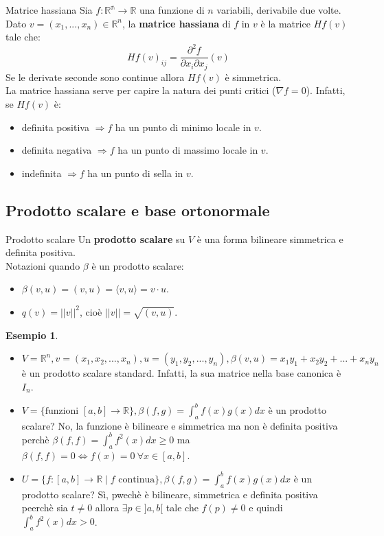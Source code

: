 \documentclass[a4paper]{article}
\theoremstyle{definition}
\newtheorem*{es}{Esempio}
\begin{document}
	\begin{deff}{Matrice hassiana}{}
		Sia $f: \mathbb{R^n} \to \mathbb{R}$ una funzione di $n$ variabili, derivabile due volte. \\
		Dato $v = (x_1, ..., x_n) \in \mathbb{R}^n$, la \textbf{matrice hassiana} di $f$ in $v$ è la matrice $Hf(v)$ tale che:
		\[ {Hf(v)}_{ij} = \frac{\partial^2 f}{\partial x_i \partial x_j}(v) \]
		Se le derivate seconde sono continue allora $Hf(v)$ è simmetrica. \\
		La matrice hassiana serve per capire la natura dei punti critici ($\nabla f = 0$). Infatti, se $Hf(v)$ è:
		\begin{itemize}
			\item definita positiva $\Rightarrow f$ ha un punto di minimo locale in $v$.
			\item definita negativa $\Rightarrow f$ ha un punto di massimo locale in $v$.
			\item indefinita $\Rightarrow f$ ha un punto di sella in $v$.
		\end{itemize}
	\end{deff}

	\subsection{Prodotto scalare e base ortonormale}

	\begin{deff}{Prodotto scalare}{}
		Un \textbf{prodotto scalare} su $V$ è una forma bilineare simmetrica e definita positiva. \\
		Notazioni quando $\beta$ è un prodotto scalare:
		\begin{itemize}
			\item $\beta(v, u) = (v, u) = \langle v, u \rangle = v \cdot u$.
			\item $q(v) = ||v||^2$, cioè $||v|| = \sqrt{(v, u)}$.
		\end{itemize}
	\end{deff}

	\begin{es}
		\begin{itemize}
			\item $V = \mathbb{R}^n, v = (x_1, x_2, ..., x_n), u = (y_1, y_2, ..., y_n), \beta(v, u) = x_1y_1 + x_2y_2 + ... + x_ny_n$ è un prodotto scalare standard.
			Infatti, la sua matrice nella base canonica è $I_n$.
			\item $V = \{\text{funzioni } [a, b] \to \mathbb{R}\}, \beta(f, g) = \int_a^b f(x)g(x)dx$ è un prodotto scalare?
			No, la funzione è bilineare e simmetrica ma non è definita positiva perchè $\beta(f, f) = \int_a^b f^2(x)dx \ge 0$ ma $\beta(f, f) = 0 \Leftrightarrow f(x) = 0 \ \forall x \in [a, b]$.
			\item $U = \{f: [a, b] \to \mathbb{R} \mid f \text{ continua}\}, \beta(f, g) = \int_a^b f(x)g(x)dx$ è un prodotto scalare?
			Sì, pwechè è bilineare, simmetrica e definita positiva peerchè sia $t \ne 0$ allora $\exists p \in ]a, b[$ tale che $f(p) \ne 0$ e quindi $\int_a^b f^2(x)dx > 0$.
		\end{itemize}
	\end{es}
\end{document}
